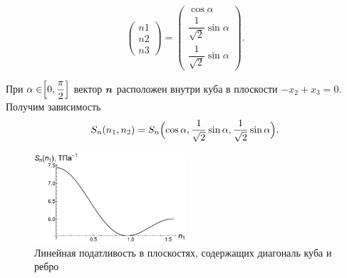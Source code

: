 \documentclass[12pt, a4paper]{article}
\renewcommand{\vec}[1]{\text{\mathversion{bold}${#1}$}}%
\begin{document}
 \[
 \begin{pmatrix}
 	n1 \\
 	n2 \\
 	n3	
 \end{pmatrix} = \begin{pmatrix}
 	\cos \alpha \\[0.2em]
 	\dfrac{1}{\sqrt 2} \sin \alpha \\[1em]
 	\dfrac{1}{\sqrt 2} \sin \alpha
 \end{pmatrix}.
 \]
 
 При $\alpha \in \Bigr[ 0, \dfrac{\pi}{2} \Bigl]$ вектор $ \vec n $ расположен внутри куба в плоскости $ -x_2 + x_3 = 0 $. Получим зависимость 
 \[
 S_n(n_1, n_2) = S_n \Bigl( \cos \alpha, \dfrac{1}{\sqrt 2} \sin \alpha, \dfrac{1}{\sqrt 2} \sin \alpha \Bigr).
 \] 
 \begin{figure}[!htbp]
 	\centering
 	\includegraphics[width=0.5\textwidth]{pic-6}%
 	\caption{Линейная податливость в плоскостях, содержащих диагональ куба и ребро}
 	\vspace*{-2mm}
 	\label{lin-grani-2-kuba}
 \end{figure}

\newpage
\end{document}
